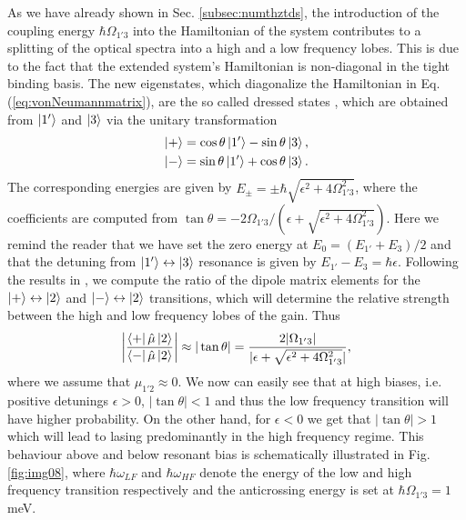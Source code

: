 \documentclass[10pt,letterpaper]{article}
\begin{document}
{\begin{appendices}
As we have already shown in Sec. \ref{subsec:numthztds}, the introduction of the coupling energy $\hbar \Omega_{1'3}$ into the Hamiltonian of the system contributes to a splitting of the optical spectra into a high and a low frequency lobes. This is due to the fact that the extended system's Hamiltonian is non-diagonal in the tight binding basis. The new eigenstates, which diagonalize the Hamiltonian in Eq. (\ref{eq:vonNeumannmatrix}), are the so called dressed states \cite{callebaut2005importance,dupont2010simplified}, which are obtained from $\Ket{1'}$ and $\Ket{3}$ via the unitary transformation
\begin{align}
\label{eq:dressedstates}
\Ket{+} &= \cos\theta \Ket{1'} - \sin\theta \Ket{3}, \nonumber \\
\Ket{-} &= \sin\theta \Ket{1'} + \cos\theta \Ket{3}.
\end{align}
The corresponding energies are given by $E_\pm =\pm \hbar\sqrt{\epsilon^2+4\Omega_{1'3}^2}$, where the coefficients are computed from  
$
\tan \theta = -2\Omega_{1'3}/(\epsilon+\sqrt{\epsilon^2+4\Omega_{1'3}^2}).
$
Here we remind the reader that we have set the zero energy at $E_0 = (E_{1'} + E_{3})/2$ and that the detuning from $\Ket {1'}\leftrightarrow\Ket{3}$ resonance is given by $E_{1'} - E_{3} = \hbar\epsilon$. Following the results in \cite{dupont2010simplified}, we compute the ratio of the dipole matrix elements for the $\Ket{+}\leftrightarrow\Ket{2}$ and $\Ket{-}\leftrightarrow\Ket{2}$ transitions, which will determine the relative strength between the high and low frequency lobes of the gain. Thus
\begin{align}
\label{eq:dresseddipoles}
\left |\frac{\Bra{+}\hat{\mu}\Ket{2}}{\Bra{-}\hat{\mu}\Ket{2}}\right | \approx |\tan\theta| =  \frac{2|\Omega_{1'3}|}{|\epsilon+\sqrt{\epsilon^2+4\Omega_{1'3}^2}|},
\end{align}
where we assume that $\mu_{1'2} \approx 0$.
We now can easily see that at high biases, i.e. positive detunings $\epsilon >0$, $|\tan\theta|<1$ and thus the low frequency transition will have higher probability. On the other hand, for $\epsilon < 0 $ we get that $|\tan\theta| >1$ which will lead to lasing predominantly in the high frequency regime. This behaviour above and below resonant bias is schematically illustrated in Fig. \ref{fig:img08}, where $\hbar\omega_{LF} $ and $\hbar\omega_{HF}$ denote the energy of the low and high frequency transition respectively and the anticrossing energy is set at $\hbar \Omega_{1'3} = 1$ meV.  


\end{appendices}}
\end{document}
